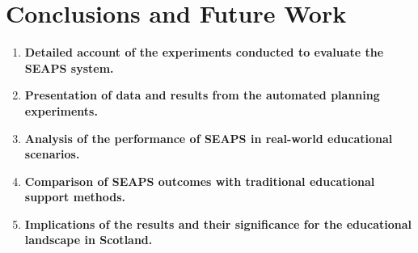\section{Conclusions and Future Work}
\begin{enumerate}
    \item \textbf{Detailed account of the experiments conducted to evaluate the SEAPS system.}
    \item \textbf{Presentation of data and results from the automated planning experiments.}
    \item \textbf{Analysis of the performance of SEAPS in real-world educational scenarios.}
    \item \textbf{Comparison of SEAPS outcomes with traditional educational support methods.}
    \item \textbf{Implications of the results and their significance for the educational landscape in Scotland.}
\end{enumerate}
